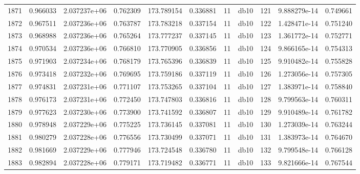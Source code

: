 \begin{tabular}{lrrrrrrlrrr}
1871 &    0.966033 &        2.037237e+06 &  0.762309 &              173.789154 &    0.336881 &      11 &         db10 &    121 &   9.888279e-14 &      0.749661 \\
1872 &    0.967511 &        2.037236e+06 &  0.763787 &              173.783218 &    0.337154 &      11 &         db10 &    122 &   1.428471e-14 &      0.751240 \\
1873 &    0.968988 &        2.037236e+06 &  0.765264 &              173.777237 &    0.337145 &      11 &         db10 &    123 &   1.361772e-14 &      0.752771 \\
1874 &    0.970534 &        2.037236e+06 &  0.766810 &              173.770905 &    0.336856 &      11 &         db10 &    124 &   9.866165e-14 &      0.754313 \\
1875 &    0.971903 &        2.037234e+06 &  0.768179 &              173.765396 &    0.336839 &      11 &         db10 &    125 &   9.910482e-14 &      0.755828 \\
1876 &    0.973418 &        2.037232e+06 &  0.769695 &              173.759186 &    0.337119 &      11 &         db10 &    126 &   1.273056e-14 &      0.757305 \\
1877 &    0.974831 &        2.037231e+06 &  0.771107 &              173.753265 &    0.337104 &      11 &         db10 &    127 &   1.383971e-14 &      0.758840 \\
1878 &    0.976173 &        2.037231e+06 &  0.772450 &              173.747803 &    0.336816 &      11 &         db10 &    128 &   9.799563e-14 &      0.760311 \\
1879 &    0.977623 &        2.037230e+06 &  0.773900 &              173.741592 &    0.336807 &      11 &         db10 &    129 &   9.910489e-14 &      0.761782 \\
1880 &    0.978948 &        2.037229e+06 &  0.775225 &              173.736145 &    0.337081 &      11 &         db10 &    130 &   1.273039e-14 &      0.763244 \\
1881 &    0.980279 &        2.037228e+06 &  0.776556 &              173.730499 &    0.337071 &      11 &         db10 &    131 &   1.383973e-14 &      0.764670 \\
1882 &    0.981669 &        2.037229e+06 &  0.777946 &              173.724548 &    0.336780 &      11 &         db10 &    132 &   9.799548e-14 &      0.766128 \\
1883 &    0.982894 &        2.037228e+06 &  0.779171 &              173.719482 &    0.336771 &      11 &         db10 &    133 &   9.821666e-14 &      0.767544 \\

\end{tabular}
